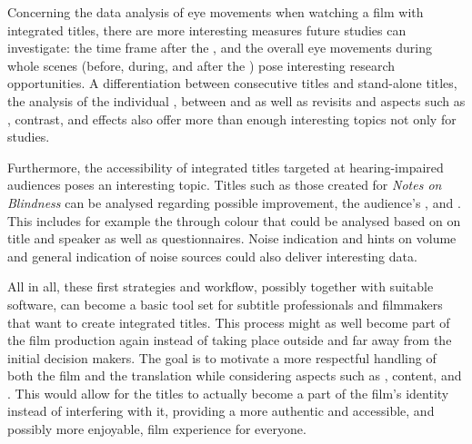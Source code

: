 Concerning the data analysis of eye movements when watching a film with integrated titles, there are more interesting measures future studies can investigate: the time frame after the , and the overall eye movements during whole scenes (before, during, and after the ) pose interesting research opportunities. A differentiation between consecutive titles and stand-alone titles, the analysis of the individual ,  between  and  as well as revisits and  aspects such as , contrast, and effects also offer more than enough interesting topics not only for  studies.

Furthermore, the accessibility of integrated titles targeted at hearing-impaired audiences poses an interesting topic. Titles such as those created for \textit{Notes on Blindness} can be analysed regarding possible improvement, the audience’s , and . This includes for example the  through colour that could be analysed based on  on title and speaker as well as questionnaires. Noise indication and hints on volume and general indication of noise sources could also deliver interesting  data.

All in all, these first  strategies and workflow, possibly together with suitable software, can become a basic tool set for subtitle professionals and filmmakers that want to create integrated titles. This process might as well become part of the film production again instead of taking place outside and far away from the initial decision makers. The goal is to motivate a more respectful handling of both the film and the translation while considering aspects such as , content, and . This would allow for the titles to actually become a part of the film’s identity instead of interfering with it, providing a more authentic and accessible, and possibly more enjoyable, film experience for everyone.
